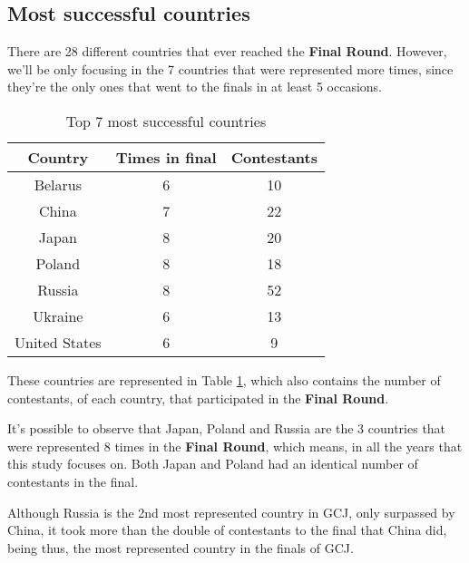\documentclass{article}
\begin{document}
\begin{multicols*}{2}
\subsection{Most successful countries}

There are 28 different countries that ever reached the \textbf{Final Round}. However, we'll be only focusing in the 7 countries that were represented more times, since they're the only ones that went to the finals in at least 5 occasions.

\begin{table}[H]
\centering
\caption{Top 7 most successful countries}
\label{top7_suc}
\begin{tabular}{c|c|c}
\textbf{Country} & \textbf{Times in final} & \textbf{Contestants} \\ \hline
Belarus          & 6                       & 10                            \\
China            & 7                       & 22                            \\
Japan            & 8                       & 20                            \\
Poland           & 8                       & 18                            \\
Russia           & 8                       & 52                            \\
Ukraine          & 6                       & 13                            \\
United States    & 6                       & 9
\end{tabular}
\end{table}

These countries are represented in Table \ref{top7_suc}, which also contains the number of contestants, of each country, that participated in the \textbf{Final Round}.

It's possible to observe that Japan, Poland and Russia are the 3 countries that were represented 8 times in the \textbf{Final Round}, which means, in all the years that this study focuses on. Both Japan and Poland had an identical number of contestants in the final.

Although Russia is the 2nd most represented country in GCJ, only surpassed by China, it took more than the double of contestants to the final that China did, being thus, the most represented country in the finals of GCJ.


\end{multicols*}
\end{document}
